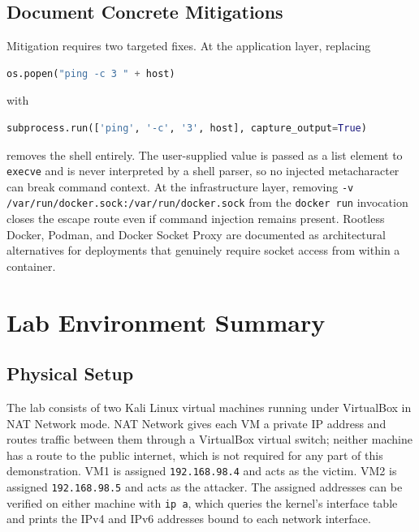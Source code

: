\subsection{Document Concrete Mitigations}

Mitigation requires two targeted fixes. At the application layer, replacing

\begin{lstlisting}[language=python]
os.popen("ping -c 3 " + host)
\end{lstlisting}

\noindent with

\begin{lstlisting}[language=python]
subprocess.run(['ping', '-c', '3', host], capture_output=True)
\end{lstlisting}

removes the shell entirely. The user-supplied value is passed as a list element
to \texttt{execve} and is never interpreted by a shell parser, so no injected
metacharacter can break command context. At the infrastructure layer, removing
\texttt{-v /var/run/docker.sock:/var/run/docker.sock} from the \texttt{docker
run} invocation closes the escape route even if command injection remains
present. Rootless Docker, Podman, and Docker Socket Proxy are documented as
architectural alternatives for deployments that genuinely require socket access
from within a container.

\section{Lab Environment Summary}

\subsection{Physical Setup}

The lab consists of two Kali Linux virtual machines running under VirtualBox in
NAT Network mode. NAT Network gives each VM a private IP address and routes
traffic between them through a VirtualBox virtual switch; neither machine has a
route to the public internet, which is not required for any part of this
demonstration. VM1 is assigned \texttt{192.168.98.4} and acts as the victim. VM2
is assigned \texttt{192.168.98.5} and acts as the attacker. The assigned
addresses can be verified on either machine with \texttt{ip a}, which queries
the kernel's interface table and prints the IPv4 and IPv6 addresses bound to
each network interface.

